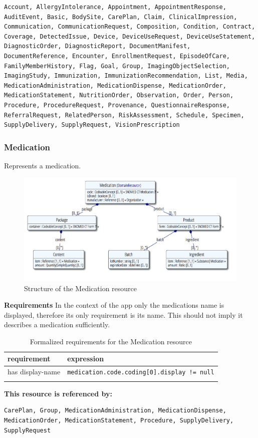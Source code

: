 \documentclass{article}
\begin{document}
\begin{lstlisting}[breaklines]
Account, AllergyIntolerance, Appointment, AppointmentResponse, AuditEvent, Basic, BodySite, CarePlan, Claim, ClinicalImpression, Communication, CommunicationRequest, Composition, Condition, Contract, Coverage, DetectedIssue, Device, DeviceUseRequest, DeviceUseStatement, DiagnosticOrder, DiagnosticReport, DocumentManifest, DocumentReference, Encounter, EnrollmentRequest, EpisodeOfCare, FamilyMemberHistory, Flag, Goal, Group, ImagingObjectSelection, ImagingStudy, Immunization, ImmunizationRecommendation, List, Media, MedicationAdministration, MedicationDispense, MedicationOrder, MedicationStatement, NutritionOrder, Observation, Order, Person, Procedure, ProcedureRequest, Provenance, QuestionnaireResponse, ReferralRequest, RelatedPerson, RiskAssessment, Schedule, Specimen, SupplyDelivery, SupplyRequest, VisionPrescription
\end{lstlisting}

\subsubsection{Medication}\label{res:medication}
Represents a medication.
\\
\begin{figure}[H]
\centering
\includegraphics[width=\linewidth]{resources/FHIR/Medication/Medication-UML.png}
\caption{Structure of the Medication resource}
\label{fig:structure-medication}
\end{figure}
\textbf{Requirements}\label{res:medication:requirements}
In the context of the app only the medications name is
displayed, therefore its only requirement is its name.
This should not imply it describes a medication sufficiently.
\\
\begin{longtable}[H]{@{}ll@{}}
\toprule
requirement & expression\\
\midrule
has display-name & \texttt{medication.code.coding[0].display != null} \\
\bottomrule
\caption{Formalized requirements for the Medication resource}
\end{longtable}
\textbf{This resource is referenced by:}\label{res:medication:referenced-by}
\\
\begin{lstlisting}[breaklines]
CarePlan, Group, MedicationAdministration, MedicationDispense, MedicationOrder, MedicationStatement, Procedure, SupplyDelivery, SupplyRequest
\end{lstlisting}
\end{document}
